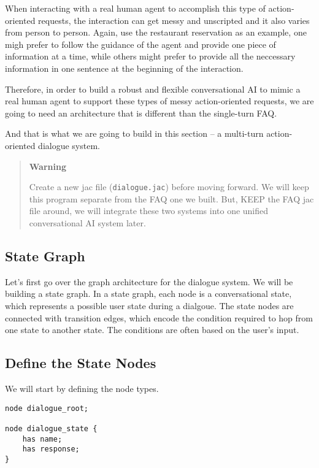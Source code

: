 When interacting with a real human agent to accomplish this type of
action-oriented requests, the interaction can get messy and unscripted
and it also varies from person to person. Again, use the restaurant
reservation as an example, one migh prefer to follow the guidance of the
agent and provide one piece of information at a time, while others might
prefer to provide all the neccessary information in one sentence at the
beginning of the interaction.

Therefore, in order to build a robust and flexible conversational AI to
mimic a real human agent to support these types of messy action-oriented
requests, we are going to need an architecture that is different than
the single-turn FAQ.

And that is what we are going to build in this section -- a multi-turn
action-oriented dialogue system.

\begin{quote}
\textbf{Warning}

Create a new jac file (\passthrough{\lstinline!dialogue.jac!}) before
moving forward. We will keep this program separate from the FAQ one we
built. But, KEEP the FAQ jac file around, we will integrate these two
systems into one unified conversational AI system later.
\end{quote}

\hypertarget{state-graph}{%
\subsection{State Graph}\label{state-graph}}

Let's first go over the graph architecture for the dialogue system. We
will be building a state graph. In a state graph, each node is a
conversational state, which represents a possible user state during a
dialgoue. The state nodes are connected with transition edges, which
encode the condition required to hop from one state to another state.
The conditions are often based on the user's input.

\hypertarget{define-the-state-nodes}{%
\subsection{Define the State Nodes}\label{define-the-state-nodes}}

We will start by defining the node types.

\begin{lstlisting}
node dialogue_root;

node dialogue_state {
    has name;
    has response;
}
\end{lstlisting}

